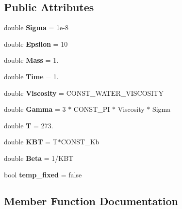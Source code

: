 \subsection*{Public Attributes}
\begin{DoxyCompactItemize}
\item 
\mbox{\label{classUnits_a91c5cddc8ff0c69608a59f6408901288}} 
double {\bfseries Sigma} = 1e-\/8
\item 
\mbox{\label{classUnits_a30bea066ae03579d8379a121a352bb40}} 
double {\bfseries Epsilon} = 10
\item 
\mbox{\label{classUnits_a2492a29544a8f9f48f45a508d2c769be}} 
double {\bfseries Mass} = 1.
\item 
\mbox{\label{classUnits_ae34bc8ebe5e2d6c1b68d8736455d5858}} 
double {\bfseries Time} = 1.
\item 
\mbox{\label{classUnits_a1bb9b94961124cd5956052ea041a79ed}} 
double {\bfseries Viscosity} = C\+O\+N\+S\+T\+\_\+\+W\+A\+T\+E\+R\+\_\+\+V\+I\+S\+C\+O\+S\+I\+TY
\item 
\mbox{\label{classUnits_a818479649ab8bd721f6a92453a266537}} 
double {\bfseries Gamma} = 3 $\ast$ C\+O\+N\+S\+T\+\_\+\+PI $\ast$ Viscosity $\ast$ Sigma
\item 
\mbox{\label{classUnits_af72bff15fed3adc2bea78b0a5a3a80bd}} 
double {\bfseries T} = 273.
\item 
\mbox{\label{classUnits_a70dca923ac22beef5408365e79cd36e3}} 
double {\bfseries K\+BT} = T$\ast$C\+O\+N\+S\+T\+\_\+\+Kb
\item 
\mbox{\label{classUnits_a9d0bfc9e3ca265985b43867f46253cfb}} 
double {\bfseries Beta} = 1/K\+BT
\item 
\mbox{\label{classUnits_a0676c1f17397656f16fbb093e77438ca}} 
bool {\bfseries temp\+\_\+fixed} = false
\end{DoxyCompactItemize}


\subsection{Member Function Documentation}
\mbox{\label{classUnits_a8d13915639d6d6aa822bc3cff675edc2}} 
